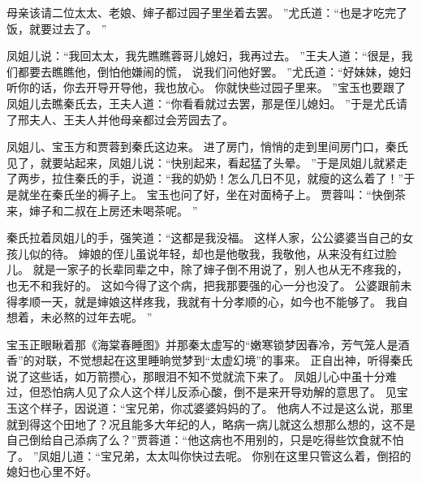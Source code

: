 母亲该请二位太太、老娘、婶子都过园子里坐着去罢。
”尤氏道：“也是才吃完了饭，就要过去了。
”\par
凤姐儿说：“我回太太，我先瞧瞧蓉哥儿媳妇，我再过去。
”王夫人道：“很是，我们都要去瞧瞧他，倒怕他嫌闹的慌，
说我们问他好罢。
”尤氏道：“好妹妹，媳妇听你的话，你去开导开导他，我也放心。
你就快些过园子里来。
”宝玉也要跟了凤姐儿去瞧秦氏去，王夫人道：“你看看就过去罢，那是侄儿媳妇。
”于是尤氏请了邢夫人、王夫人并他母亲都过会芳园去了。
\par
凤姐儿、宝玉方和贾蓉到秦氏这边来。
进了房门，悄悄的走到里间房门口，秦氏见了，就要站起来，凤姐儿说：“快别起来，看起猛了头晕。
”于是凤姐儿就紧走了两步，拉住秦氏的手，说道：“我的奶奶！怎么几日不见，就瘦的这么着了！”于是就坐在秦氏坐的褥子上。
宝玉也问了好，坐在对面椅子上。
贾蓉叫：“快倒茶来，婶子和二叔在上房还未喝茶呢。
”\par
秦氏拉着凤姐儿的手，强笑道：“这都是我没福。
这样人家，公公婆婆当自己的女孩儿似的待。
婶娘的侄儿虽说年轻，却也是他敬我，我敬他，从来没有红过脸儿。
就是一家子的长辈同辈之中，除了婶子倒不用说了，别人也从无不疼我的，也无不和我好的。
这如今得了这个病，把我那要强的心一分也没了。
公婆跟前未得孝顺一天，就是婶娘这样疼我，我就有十分孝顺的心，如今也不能够了。
我自想着，未必熬的过年去呢。
”\par
宝玉正眼瞅着那《海棠春睡图》并那秦太虚写的“嫩寒锁梦因春冷，芳气笼人是酒香”的对联，不觉想起在这里睡晌觉梦到“太虚幻境”的事来。
正自出神，听得秦氏说了这些话，如万箭攒心，那眼泪不知不觉就流下来了。
凤姐儿心中虽十分难过，但恐怕病人见了众人这个样儿反添心酸，倒不是来开导劝解的意思了。
见宝玉这个样子，因说道：“宝兄弟，你忒婆婆妈妈的了。
他病人不过是这么说，那里就到得这个田地了？况且能多大年纪的人，略病一病儿就这么想那么想的，这不是自己倒给自己添病了么？”贾蓉道：“他这病也不用别的，只是吃得些饮食就不怕了。
”凤姐儿道：“宝兄弟，太太叫你快过去呢。
你别在这里只管这么着，倒招的媳妇也心里不好。
